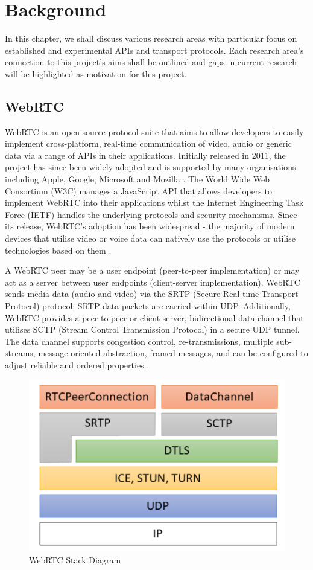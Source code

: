 \chapter{Background}

In this chapter, we shall discuss various research areas with particular focus on established and experimental APIs and transport protocols. Each research area's connection to this project's aims shall be outlined and gaps in current research will be highlighted as motivation for this project.

\section{WebRTC}

WebRTC is an open-source protocol suite that aims to allow developers to easily implement cross-platform, real-time communication of video, audio or generic data via a range of APIs in their applications. Initially released in 2011, the project has since been widely adopted and is supported by many organisations including Apple, Google, Microsoft and Mozilla \cite{webrtc.org}. The World Wide Web Consortium (W3C) manages a JavaScript API that allows developers to implement WebRTC into their applications whilst the Internet Engineering Task Force (IETF) handles the underlying protocols and security mechanisms. Since its release, WebRTC's adoption has been widespread - the majority of modern devices that utilise video or voice data can natively use the protocols or utilise technologies based on them \cite{gross_2020}.

A WebRTC peer may be a user endpoint (peer-to-peer implementation) or may act as a server between user endpoints (client-server implementation). WebRTC sends media data (audio and video) via the SRTP (Secure Real-time Transport Protocol) protocol; SRTP data packets are carried within UDP. Additionally, WebRTC provides a peer-to-peer or client-server, bidirectional data channel that utilises SCTP (Stream Control Transmission Protocol) in a secure UDP tunnel. The data channel supports congestion control, re-transmissions, multiple sub-streams, message-oriented abstraction, framed messages, and can be configured to adjust reliable and ordered properties \cite{webrtc-sctp}. 

\begin{figure}[h]
    \centering
    \includegraphics[width=0.4\columnwidth]{images/WebRTC connection stack.png}
	\caption{WebRTC Stack Diagram \cite{garcia2020}}
    \label{webrtc_connection_stack}
\end{figure}

